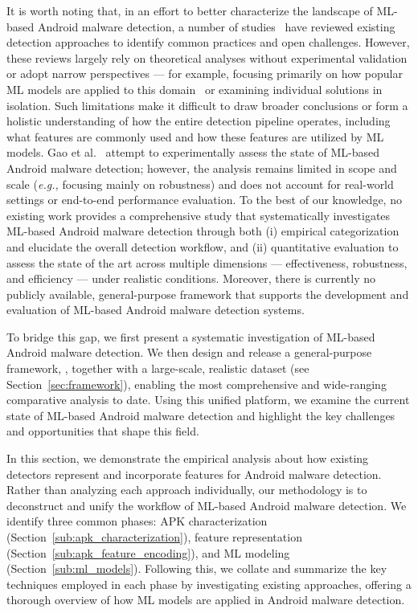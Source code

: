 It is worth noting that, in an effort to better characterize the landscape of ML-based Android malware detection, a number of studies~\cite{souri2018state,qiu2020survey,liu2022deep,faruki2014android,gao2024comprehensive} have reviewed existing detection approaches to identify common practices and open challenges.
However, these reviews largely rely on theoretical analyses without experimental validation or adopt narrow perspectives --- for example, focusing primarily on how popular ML models are applied to this domain~\cite{qiu2020survey} or examining individual solutions in isolation.
Such limitations make it difficult to draw broader conclusions or form a holistic understanding of how the entire detection pipeline operates, including what features are commonly used and how these features are utilized by ML models.
Gao et al.~\cite{gao2024comprehensive} attempt to experimentally assess the state of ML-based Android malware detection; however, the analysis remains limited in scope and scale (\textit{e.g.,} focusing mainly on robustness) and does not account for real-world settings or end-to-end performance evaluation.
To the best of our knowledge, no existing work provides a comprehensive study that systematically investigates ML-based Android malware detection through both (i) empirical categorization and elucidate the overall detection workflow, and (ii) quantitative evaluation to assess the state of the art across multiple dimensions --- effectiveness, robustness, and efficiency --- under realistic conditions.
Moreover, there is currently no publicly available, general-purpose framework that supports the development and evaluation of ML-based Android malware detection systems.

To bridge this gap, we first present a systematic investigation of ML-based Android malware detection.
We then design and release a general-purpose framework, \codename, together with a large-scale, realistic dataset (see Section~\ref{sec:framework}), enabling the most comprehensive and wide-ranging comparative analysis to date.
Using this unified platform, we examine the current state of ML-based Android malware detection and highlight the key challenges and opportunities that shape this field.

In this section, we demonstrate the empirical analysis about how existing detectors represent and incorporate features for Android malware detection. 
Rather than analyzing each approach individually, our methodology is to deconstruct and unify the workflow of ML-based Android malware detection. We identify three common phases: APK characterization (Section~\ref{sub:apk_characterization}), feature representation (Section~\ref{sub:apk_feature_encoding}), and ML modeling (Section~\ref{sub:ml_models}).
Following this, we collate and summarize the key techniques employed in each phase by investigating existing approaches, offering a thorough overview of how ML models are applied in Android malware detection.

